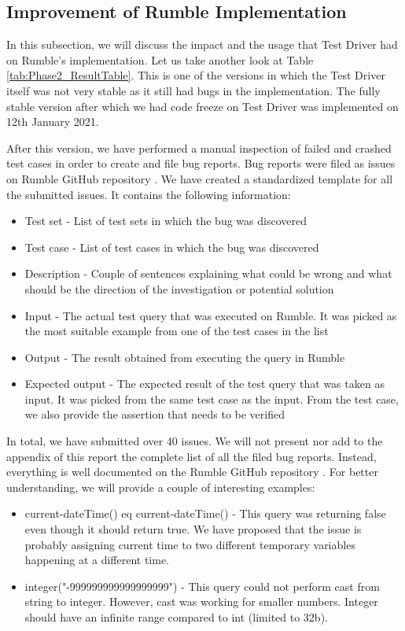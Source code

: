 \subsection{Improvement of Rumble Implementation}
In this subsection, we will discuss the impact and the usage that Test Driver had on Rumble's implementation. Let us take another look at Table \ref{tab:Phase2_ResultTable}. This is one of the versions in which the Test Driver itself was not very stable as it still had bugs in the implementation. The fully stable version after which we had code freeze on Test Driver was implemented on 12th January 2021. 

After this version, we have performed a manual inspection of failed and crashed test cases in order to create and file bug reports. Bug reports were filed as issues on Rumble GitHub repository \cite{RumbleRepository}. We have created a standardized template for all the submitted issues. It contains the following information:
\begin{itemize}
	\item Test set - List of test sets in which the bug was discovered
	\item Test case - List of test cases in which the bug was discovered
	\item Description - Couple of sentences explaining what could be wrong and what should be the direction of the investigation or potential solution
	\item Input - The actual test query that was executed on Rumble. It was picked as the most suitable example from one of the test cases in the list
	\item Output - The result obtained from executing the query in Rumble
	\item Expected output - The expected result of the test query that was taken as input. It was picked from the same test case as the input. From the test case, we also provide the assertion that needs to be verified
\end{itemize}

In total, we have submitted over 40 issues. We will not present nor add to the appendix of this report the complete list of all the filed bug reports. Instead, everything is well documented on the Rumble GitHub repository \cite{IssuesSubmitted}. For better understanding, we will provide a couple of interesting examples:
\begin{itemize}
	\item current-dateTime() eq current-dateTime() - This query was returning false even though it should return true. We have proposed that the issue is probably assigning current time to two different temporary variables happening at a different time.
	\item integer("-999999999999999999") - This query could not perform cast from string to integer. However, cast was working for smaller numbers. Integer should have an infinite range compared to int (limited to 32b).
\end{itemize}

